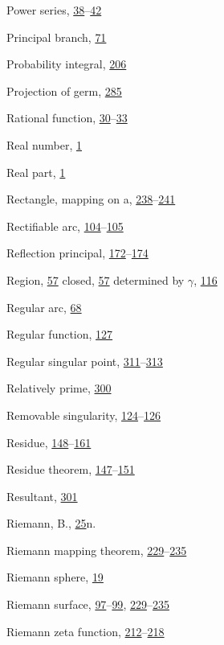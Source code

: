 \begin{theindex}
\item Power series, \hyperlink{orig-p38}{38}--\hyperlink{orig-p42}{42}
\item Principal branch, \hyperlink{orig-p71}{71}
\item Probability integral, \hyperlink{orig-p206}{206}
\item Projection of germ, \hyperlink{orig-p285}{285}
\item Rational function, \hyperlink{orig-p30}{30}--\hyperlink{orig-p33}{33}
\item Real number, \hyperlink{orig-p1}{1}
\item Real part, \hyperlink{orig-p1}{1}
\item Rectangle, mapping on a, \hyperlink{orig-p238}{238}--\hyperlink{orig-p241}{241}
\item Rectifiable arc, \hyperlink{orig-p104}{104}--\hyperlink{orig-p105}{105}
\item Reflection principal, \hyperlink{orig-p172}{172}--\hyperlink{orig-p174}{174}
\item Region, \hyperlink{orig-p57}{57}
\subitem closed, \hyperlink{orig-p57}{57}
\subitem determined by $\gamma$, \hyperlink{orig-p116}{116}
\item Regular arc, \hyperlink{orig-p68}{68}
\item Regular function, \hyperlink{orig-p127}{127}
\item Regular singular point, \hyperlink{orig-p311}{311}--\hyperlink{orig-p313}{313}
\item Relatively prime, \hyperlink{orig-p300}{300}
\item Removable singularity, \hyperlink{orig-p124}{124}--\hyperlink{orig-p126}{126}
\item Residue, \hyperlink{orig-p148}{148}--\hyperlink{orig-p161}{161}
\item Residue theorem, \hyperlink{orig-p147}{147}--\hyperlink{orig-p151}{151}
\item Resultant, \hyperlink{orig-p301}{301}
\item Riemann, B., \hyperlink{orig-p25}{25}n.
\item Riemann mapping theorem, \hyperlink{orig-p229}{229}--\hyperlink{orig-p235}{235}
\item Riemann sphere, \hyperlink{orig-p19}{19}
\item Riemann surface, \hyperlink{orig-p97}{97}--\hyperlink{orig-p99}{99}, \hyperlink{orig-p229}{229}--\hyperlink{orig-p235}{235}
\item Riemann zeta function, \hyperlink{orig-p212}{212}--\hyperlink{orig-p218}{218}

\end{theindex}
